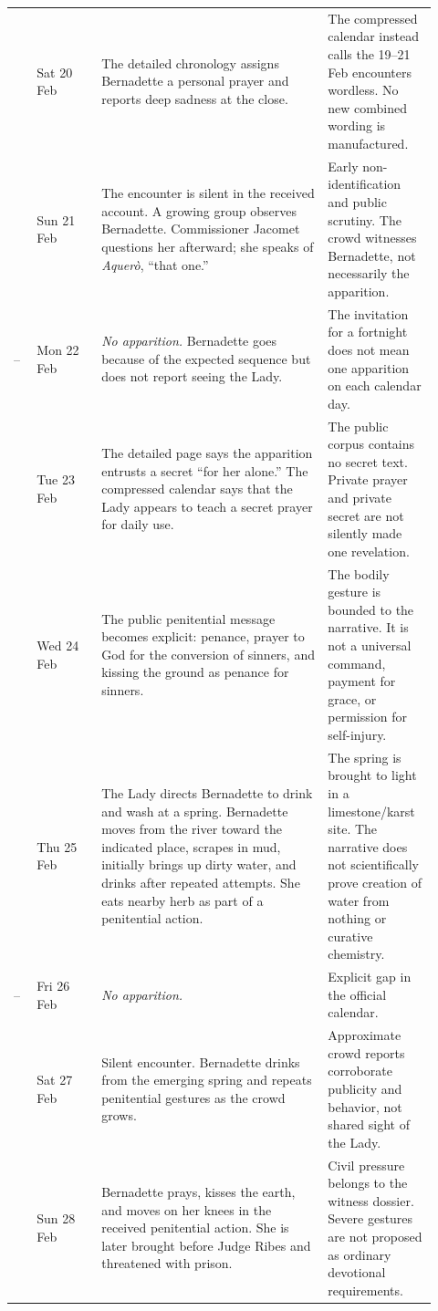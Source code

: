 \begin{longtable}{>{\bfseries\raggedright\arraybackslash}p{0.055\linewidth}>{\raggedright\arraybackslash}p{0.14\linewidth}>{\raggedright\arraybackslash}p{0.49\linewidth}>{\raggedright\arraybackslash}p{0.23\linewidth}}
5 & Sat 20 Feb & The detailed chronology assigns Bernadette a personal prayer and reports deep sadness at the close. & The compressed calendar instead calls the 19--21 Feb encounters wordless. No new combined wording is manufactured.\\
6 & Sun 21 Feb & The encounter is silent in the received account. A growing group observes Bernadette. Commissioner Jacomet questions her afterward; she speaks of \emph{Aquerò}, “that one.” & Early non-identification and public scrutiny. The crowd witnesses Bernadette, not necessarily the apparition.\\
-- & Mon 22 Feb & \emph{No apparition.} Bernadette goes because of the expected sequence but does not report seeing the Lady. & The invitation for a fortnight does not mean one apparition on each calendar day.\\
7 & Tue 23 Feb & The detailed page says the apparition entrusts a secret “for her alone.” The compressed calendar says that the Lady appears to teach a secret prayer for daily use. & The public corpus contains no secret text. Private prayer and private secret are not silently made one revelation.\\
8 & Wed 24 Feb & The public penitential message becomes explicit: penance, prayer to God for the conversion of sinners, and kissing the ground as penance for sinners. & The bodily gesture is bounded to the narrative. It is not a universal command, payment for grace, or permission for self-injury.\\
9 & Thu 25 Feb & The Lady directs Bernadette to drink and wash at a spring. Bernadette moves from the river toward the indicated place, scrapes in mud, initially brings up dirty water, and drinks after repeated attempts. She eats nearby herb as part of a penitential action. & The spring is brought to light in a limestone/karst site. The narrative does not scientifically prove creation of water from nothing or curative chemistry.\\
-- & Fri 26 Feb & \emph{No apparition.} & Explicit gap in the official calendar.\\
10 & Sat 27 Feb & Silent encounter. Bernadette drinks from the emerging spring and repeats penitential gestures as the crowd grows. & Approximate crowd reports corroborate publicity and behavior, not shared sight of the Lady.\\
11 & Sun 28 Feb & Bernadette prays, kisses the earth, and moves on her knees in the received penitential action. She is later brought before Judge Ribes and threatened with prison. & Civil pressure belongs to the witness dossier. Severe gestures are not proposed as ordinary devotional requirements.\\

\end{longtable}
